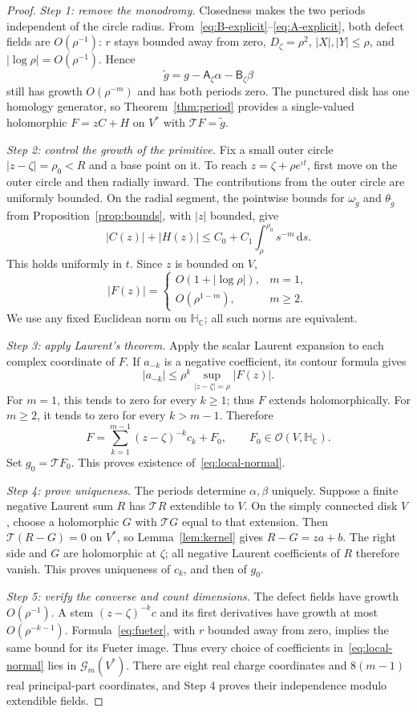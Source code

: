 \documentclass[11pt,a4paper]{article}
\numberwithin{equation}{section}
\theoremstyle{definition}
\theoremstyle{remark}
\newcommand{\C}{\mathbb C}
\newcommand{\HC}{\mathbb H_{\C}}
\newcommand{\Hol}{\mathcal O}
\newcommand{\T}{\mathcal T}
\newcommand{\dd}{\,\mathrm d}
\newcommand{\Adef}{\mathsf A}
\newcommand{\Bdef}{\mathsf B}
\begin{document}
\begin{proof}
\emph{Step 1: remove the monodromy.}
Closedness makes the two periods independent of the circle radius.
From~\eqref{eq:B-explicit}--\eqref{eq:A-explicit}, both defect fields
are $O(\rho^{-1})$: $r$ stays bounded away from zero, $D_\zeta=\rho^2$,
$|X|,|Y|\le\rho$, and $|\log\rho|=O(\rho^{-1})$.
Hence
\[
 \widetilde g=g-\Adef_\zeta\alpha-\Bdef_\zeta\beta
\]
still has growth $O(\rho^{-m})$ and has both periods zero. The punctured
disk has one homology generator, so Theorem~\ref{thm:period} provides a
single-valued holomorphic $F=zC+H$ on $V^*$ with $\T F=\widetilde g$.

\emph{Step 2: control the growth of the primitive.}
Fix a small outer circle $|z-\zeta|=\rho_0<R$ and a base point on it.
To reach $z=\zeta+\rho e^{\iota t}$, first move on the outer circle
and then radially inward. The contributions from the outer circle are
uniformly bounded. On the radial segment, the pointwise bounds for
$\omega_{\widetilde g}$ and $\theta_{\widetilde g}$ from
Proposition~\ref{prop:bounds}, with $|z|$ bounded, give
\[
 |C(z)|+|H(z)|\le C_0+C_1\int_\rho^{\rho_0}s^{-m}\dd s.
\]
This holds uniformly in $t$. Since $z$ is bounded on $V$,
\begin{equation}
 |F(z)|=
 \begin{cases}
 O(1+|\log\rho|),&m=1,\\
 O(\rho^{1-m}),&m\ge2.
 \end{cases}
 \label{eq:primitive-growth}
\end{equation}
We use any fixed Euclidean norm on $\HC$; all such norms are equivalent.

\emph{Step 3: apply Laurent's theorem.}
Apply the scalar Laurent expansion to each complex coordinate of $F$.
If $a_{-k}$ is a negative coefficient, its contour formula gives
\[
 |a_{-k}|\le\rho^k\sup_{|z-\zeta|=\rho}|F(z)|.
\]
For $m=1$, this tends to zero for every $k\ge1$; thus $F$ extends
holomorphically. For $m\ge2$, it tends to zero for every $k>m-1$.
Therefore
\[
 F=\sum_{k=1}^{m-1}(z-\zeta)^{-k}c_k+F_0,
 \qquad F_0\in\Hol(V,\HC).
\]
Set $g_0=\T F_0$. This proves existence of~\eqref{eq:local-normal}.

\emph{Step 4: prove uniqueness.}
The periods determine $\alpha,\beta$ uniquely. Suppose a finite negative
Laurent sum $R$ has $\T R$ extendible to $V$. On the simply connected
disk $V$, choose a holomorphic $G$ with $\T G$ equal to that extension.
Then $\T(R-G)=0$ on $V^*$, so Lemma~\ref{lem:kernel} gives
$R-G=za+b$. The right side and $G$ are holomorphic at $\zeta$; all
negative Laurent coefficients of $R$ therefore vanish. This proves
uniqueness of $c_k$, and then of $g_0$.

\emph{Step 5: verify the converse and count dimensions.}
The defect fields have growth $O(\rho^{-1})$. A stem
$(z-\zeta)^{-k}c$ and its first derivatives have growth at most
$O(\rho^{-k-1})$. Formula~\eqref{eq:fueter}, with $r$ bounded away
from zero, implies the same bound for its Fueter image. Thus every
choice of coefficients in~\eqref{eq:local-normal} lies in
$\mathcal G_m(V^*)$. There are eight real charge coordinates and
$8(m-1)$ real principal-part coordinates, and Step 4 proves their
independence modulo extendible fields.
\end{proof}
\end{document}
